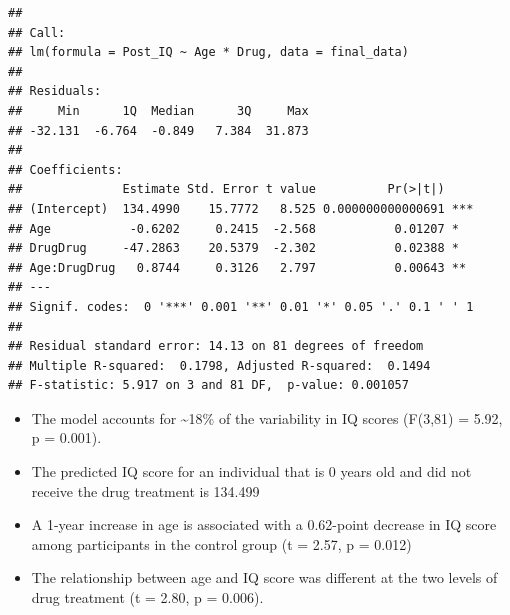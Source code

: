 \documentclass[
]{book}
\newenvironment{Shaded}{\begin{snugshade}}{\end{snugshade}}
\newcommand{\AttributeTok}[1]{\textcolor[rgb]{0.13,0.29,0.53}{#1}}
\newcommand{\CommentTok}[1]{\textcolor[rgb]{0.56,0.35,0.01}{\textit{#1}}}
\newcommand{\DocumentationTok}[1]{\textcolor[rgb]{0.56,0.35,0.01}{\textbf{\textit{#1}}}}
\newcommand{\FunctionTok}[1]{\textcolor[rgb]{0.13,0.29,0.53}{\textbf{#1}}}
\newcommand{\NormalTok}[1]{#1}
\newcommand{\OtherTok}[1]{\textcolor[rgb]{0.56,0.35,0.01}{#1}}
\newcommand{\SpecialCharTok}[1]{\textcolor[rgb]{0.81,0.36,0.00}{\textbf{#1}}}
\newcommand{\StringTok}[1]{\textcolor[rgb]{0.31,0.60,0.02}{#1}}
\providecommand{\tightlist}{%
  \setlength{\itemsep}{0pt}\setlength{\parskip}{0pt}}
\begin{document}
\begin{verbatim}
## 
## Call:
## lm(formula = Post_IQ ~ Age * Drug, data = final_data)
## 
## Residuals:
##     Min      1Q  Median      3Q     Max 
## -32.131  -6.764  -0.849   7.384  31.873 
## 
## Coefficients:
##              Estimate Std. Error t value          Pr(>|t|)    
## (Intercept)  134.4990    15.7772   8.525 0.000000000000691 ***
## Age           -0.6202     0.2415  -2.568           0.01207 *  
## DrugDrug     -47.2863    20.5379  -2.302           0.02388 *  
## Age:DrugDrug   0.8744     0.3126   2.797           0.00643 ** 
## ---
## Signif. codes:  0 '***' 0.001 '**' 0.01 '*' 0.05 '.' 0.1 ' ' 1
## 
## Residual standard error: 14.13 on 81 degrees of freedom
## Multiple R-squared:  0.1798, Adjusted R-squared:  0.1494 
## F-statistic: 5.917 on 3 and 81 DF,  p-value: 0.001057
\end{verbatim}

\begin{itemize}
\tightlist
\item
  The model accounts for \textasciitilde18\% of the variability in IQ scores (F(3,81) = 5.92, p = 0.001).
\item
  The predicted IQ score for an individual that is 0 years old and did not receive the drug treatment is 134.499
\item
  A 1-year increase in age is associated with a 0.62-point decrease in IQ score among participants in the control group (t = 2.57, p = 0.012)
\item
  The relationship between age and IQ score was different at the two levels of drug treatment (t = 2.80, p = 0.006).
\end{itemize}

\begin{Shaded}
\end{Shaded}
\end{document}
